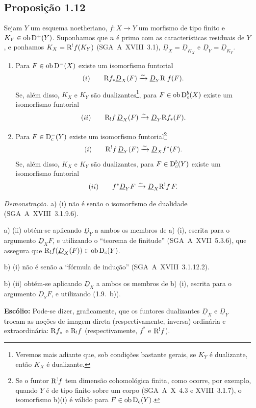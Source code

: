 \subsection*{Proposição 1.12}
Sejam $Y$ um esquema noetheriano, $f : X \to Y$ um morfismo de tipo finito e $K_Y \in \operatorname{ob} \mathrm{D}^{+}(Y)$. Suponhamos que $n$ é primo com as características residuais de $Y$, e ponhamos $K_X = \mathrm{R}^{!}f(K_Y)$ (SGA~A~XVIII~3.1), $\underline{D}_X = \underline{D}_{K_X}$ e $\underline{D}_Y = \underline{D}_{K_Y}$.
\begin{enumerate}
\item[a)] Para $F \in \operatorname{ob} \mathrm{D}^{-}(X)$ existe um isomorfismo funtorial
\[
(i) \qquad \mathrm{R} f_{*} \underline{D}_X(F) \xrightarrow{\sim} \underline{D}_Y \mathrm{R}_{!}f(F).
\]
Se, além disso, $K_X$ e $K_Y$ são dualizantes\footnote{Veremos mais adiante que, sob condições bastante gerais, se $K_Y$ é dualizante, então $K_X$ é dualizante.}, para $F \in \operatorname{ob} \mathrm{D}_c^{b}(X)$ existe um isomorfismo funtorial
\[
(ii) \qquad \mathrm{R}_{!}f \, \underline{D}_X(F) \xrightarrow{\sim} \underline{D}_Y \mathrm{R} f_{*}(F).
\]
\item[b)] Para $F \in \mathrm{D}_c^{-}(Y)$ existe um isomorfismo funtorial\footnote{Se o funtor $\mathrm{R}^{!}f$ tem dimensão cohomológica finita, como ocorre, por exemplo, quando $Y$ é de tipo finito sobre um corpo (SGA~A~X~4.3 e XVIII~3.1.7), o isomorfismo b)(i) é válido para $F \in \operatorname{ob} \mathrm{D}_c(Y)$.}
\[
(i) \qquad \mathrm{R}^{!}f \, \underline{D}_Y(F) \xrightarrow{\sim} \underline{D}_X f^{*}(F).
\]
Se, além disso, $K_X$ e $K_Y$ são dualizantes\footnotemark[3], para $F \in \mathrm{D}_c^{b}(Y)$ existe um isomorfismo funtorial
\[
(ii) \qquad f^{*} \underline{D}_Y F \xrightarrow{\sim} \underline{D}_X \mathrm{R}^{!}f \, F.
\]
\end{enumerate}

\emph{Demonstração.} a) (i) não é senão o isomorfismo de dualidade (SGA~A~XVIII~3.1.9.6).

a) (ii) obtém-se aplicando $\underline{D}_Y$ a ambos os membros de a) (i), escrita para o argumento $\underline{D}_X F$, e utilizando o \textquotedblleft teorema de finitude\textquotedblright{} (SGA~A~XVII~5.3.6), que assegura que $\mathrm{R}_{!}f(\underline{D}_X(F)) \in \operatorname{ob} \mathrm{D}_c(Y)$.

b) (i) não é senão a \textquotedblleft fórmula de indução\textquotedblright{} (SGA~A~XVIII~3.1.12.2).

b) (ii) obtém-se aplicando $\underline{D}_X$ a ambos os membros de b) (i), escrita para o argumento $\underline{D}_Y F$, e utilizando (1.9.~b)).

\textbf{Escólio:} Pode-se dizer, graficamente, que os funtores dualizantes $\underline{D}_X$ e $\underline{D}_Y$ trocam as noções de imagem direta (respectivamente, inversa) ordinária e extraordinária: $\mathrm{R} f_{*}$ e $\mathrm{R}_{!}f$ (respectivamente, $f^{*}$ e $\mathrm{R}^{!}f$).
